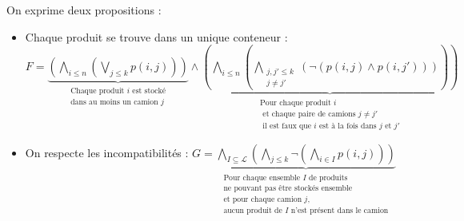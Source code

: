\documentclass[]{article}
\theoremstyle{remark}
\theoremstyle{definition}
\begin{document}
On exprime deux propositions :
\begin{itemize}
	\item Chaque produit se trouve dans un unique conteneur :
	$F = \underbrace{\left(\bigwedge\limits_{i \leqslant n} \left(\bigvee\limits_{j \leqslant k} p(i, j)\right) \right)}_{\substack{\text{Chaque produit } i \text{ est stocké} \\ \text{dans au moins un camion } j}} \land
	\underbrace{\left(\bigwedge\limits_{i \leqslant n} \left(\bigwedge\limits_{\substack{j, j' \leqslant k \\ j \neq j'}}(\neg\left(p(i, j) \land p(i, j')\right))\right)\right)}_{\substack{\text{Pour chaque produit } i \\ \text{ et chaque paire de camions } j \neq j' \\ \text{ il est faux que  } i \text{ est à la fois dans } j \text{ et } j'}}$
	
	\item On respecte les incompatibilités : $G = \underbrace{\bigwedge\limits_{I \subseteq \mathcal{L}} \left( \bigwedge\limits_{j \leqslant k}\neg \left( \bigwedge\limits_{i \in I}p(i, j)\right)\right)}_{\substack{\text{Pour chaque ensemble } I \text{ de produits } \\ \text{ne pouvant pas être stockés ensemble} \\ \text{et pour chaque camion } j , \\ \text{aucun produit de } I \text{ n'est présent dans le camion}}}$
\end{itemize}
\end{document}
